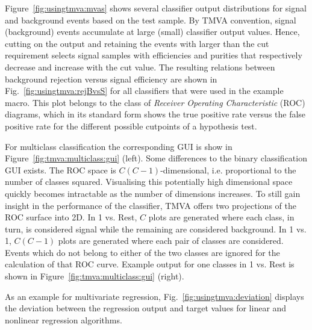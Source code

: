 Figure~\ref{fig:usingtmva:mvas} shows several classifier output
distributions for signal and background events based on the test sample.
By TMVA convention, signal (background) events accumulate at large
(small) classifier output values. Hence, cutting on the output and retaining
the events with \yMVA larger than the cut requirement selects signal samples
with efficiencies and purities that respectively decrease and increase with
the cut value. The resulting relations between background rejection versus
signal efficiency are shown in Fig.~\ref{fig:usingtmva:rejBvsS} for all
classifiers that were used in the example macro. This plot belongs to the
class of {\em Receiver Operating Characteristic} (ROC) diagrams,
which in its standard form shows the true positive rate versus the false
positive rate for the different possible cutpoints of a hypothesis test.

For multiclass classification the corresponding GUI is show in Figure~\ref{fig:tmva:multiclass:gui} (left). Some differences to the binary classification GUI exists.
The ROC space is $C(C-1)$-dimensional, i.e. proportional to the number of classes squared. Visualising this potentially high dimensional space quickly becomes intractable as the number of dimensions increases. To still gain insight in the performance of the classifier, TMVA offers two projections of the ROC surface into 2D.
In 1 vs. Rest, $C$ plots are generated where each class, in turn, is considered signal while the remaining are considered background.
In 1 vs. 1, $C(C-1)$ plots are generated where each pair of classes are considered. Events which do not belong to either of the two classes are ignored for the calculation of that ROC curve.
Example output for one classes in 1 vs. Rest is shown in Figure~\ref{fig:tmva:multiclass:gui} (right).

As an example for multivariate regression, Fig.~\ref{fig:usingtmva:deviation} displays
the deviation between the regression output and target values for linear and
nonlinear regression algorithms.

